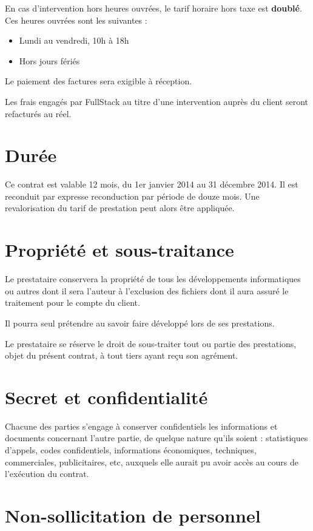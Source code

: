\documentclass[11pt]{article}
\begin{document}
En cas d'intervention hors heures ouvrées, le tarif horaire hors taxe est \textbf{doublé}. Ces heures ouvrées sont les suivantes :

\begin{itemize}
  \item Lundi au vendredi, 10h à 18h
  \item Hors jours fériés
\end{itemize}

Le paiement des factures sera exigible à réception.

Les frais engagés par FullStack au titre d'une intervention auprès du client seront refacturés au réel.

\section{Durée}

Ce contrat est valable 12 mois, du 1er janvier 2014 au 31 décembre 2014. Il est reconduit par expresse reconduction par période de douze mois. Une revalorisation du tarif de prestation peut alors être appliquée.

\section{Propriété et sous-traitance}

Le prestataire conservera la propriété de tous les développements informatiques ou autres dont il sera l'auteur à l'exclusion des fichiers dont il aura assuré le traitement pour le compte du client.

Il pourra seul prétendre au savoir faire développé lors de ses prestations.

Le prestataire se réserve le droit de sous-traiter tout ou partie des prestations, objet du présent contrat, à tout tiers ayant reçu son agrément.

\section{Secret et confidentialité}

Chacune des parties s'engage à conserver confidentiels les informations et documents concernant l'autre partie, de quelque nature qu'ils soient : statistiques d'appels, codes confidentiels, informations économiques, techniques, commerciales, publicitaires, etc, auxquels elle aurait pu avoir accès au cours de l'exécution du contrat.

\section{Non-sollicitation de personnel}
\end{document}
